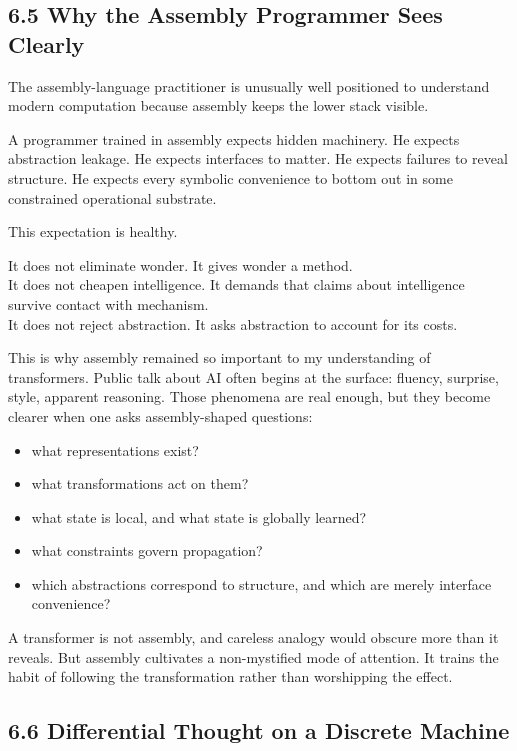 \hypertarget{why-the-assembly-programmer-sees-clearly}{%
\subsection{6.5 Why the Assembly Programmer Sees
Clearly}\label{why-the-assembly-programmer-sees-clearly}}

The assembly-language practitioner is unusually well positioned to
understand modern computation because assembly keeps the lower stack
visible.

A programmer trained in assembly expects hidden machinery. He expects
abstraction leakage. He expects interfaces to matter. He expects
failures to reveal structure. He expects every symbolic convenience to
bottom out in some constrained operational substrate.

This expectation is healthy.

It does not eliminate wonder. It gives wonder a method.\\
It does not cheapen intelligence. It demands that claims about
intelligence survive contact with mechanism.\\
It does not reject abstraction. It asks abstraction to account for its
costs.

This is why assembly remained so important to my understanding of
transformers. Public talk about AI often begins at the surface: fluency,
surprise, style, apparent reasoning. Those phenomena are real enough,
but they become clearer when one asks assembly-shaped questions:

\begin{itemize}
\tightlist
\item
  what representations exist?
\item
  what transformations act on them?
\item
  what state is local, and what state is globally learned?
\item
  what constraints govern propagation?
\item
  which abstractions correspond to structure, and which are merely
  interface convenience?
\end{itemize}

A transformer is not assembly, and careless analogy would obscure more
than it reveals. But assembly cultivates a non-mystified mode of
attention. It trains the habit of following the transformation rather
than worshipping the effect.

\hypertarget{differential-thought-on-a-discrete-machine}{%
\subsection{6.6 Differential Thought on a Discrete
Machine}\label{differential-thought-on-a-discrete-machine}}

